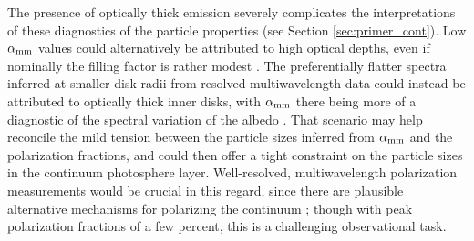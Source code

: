 \documentclass[a4paper]{ar-1col}
\begin{document}
The presence of optically thick emission severely complicates the interpretations of these diagnostics of the particle properties (see Section \ref{sec:primer_cont}).  Low $\alpha_{\rm mm}$ values could alternatively be attributed to high optical depths, even if nominally the filling factor is rather modest \citep[e.g.,][]{ricci12}.  The preferentially flatter spectra inferred at smaller disk radii from resolved multiwavelength data could instead be attributed to optically thick inner disks, with $\alpha_{\rm mm}$ there being more of a diagnostic of the spectral variation of the albedo \citep{zhu19,liu19}.  That scenario may help reconcile the mild tension between the particle sizes inferred from $\alpha_{\rm mm}$ and the polarization fractions, and could then offer a tight constraint on the particle sizes in the continuum photosphere layer.  Well-resolved, multiwavelength polarization measurements would be crucial in this regard, since there are plausible alternative mechanisms for polarizing the continuum \citep[e.g.,][]{matsakos16,stephens17,tazaki17,yang19,kataoka19}; though with peak polarization fractions of a few percent, this is a challenging observational task.            


\end{document}
